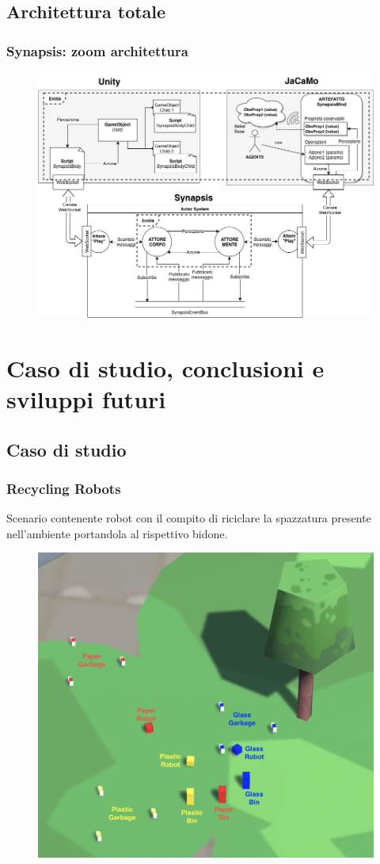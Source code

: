 \documentclass[handout]{beamer}\mode<presentation>{\usetheme{AMSCesenaBleu}}
\begin{document}
\subsection{Architettura totale}

\begin{frame}
\frametitle[Synapsis, Liberie JaCaMo e Unity]{Synapsis: zoom architettura}

\begin{figure}
\includegraphics[width=0.8\linewidth]{figures/Synapsis.png}
\end{figure}

\end{frame}

\section{Caso di studio, conclusioni e sviluppi futuri}

\subsection{Caso di studio}

\begin{frame}
\frametitle[Conclusioni e sviluppi futuri]{Recycling Robots}

Scenario contenente robot con il compito di riciclare la spazzatura presente nell'ambiente portandola al rispettivo bidone.


\begin{figure}
\includegraphics[width=0.5\linewidth]{figures/recycling_robots.png}
\end{figure}

\end{frame}
\end{document}
